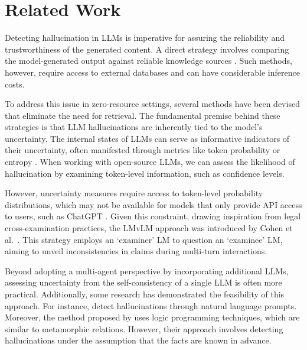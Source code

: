 \section{Related Work}
Detecting hallucination in LLMs is imperative for assuring the reliability and trustworthiness of the generated content. A direct strategy involves comparing the model-generated output against reliable knowledge sources \cite{guo2022survey, augenstein2019multifc, Hanselowski2019ARA, Atanasova2020GeneratingFC, 202307.1723, huo2023retrieving}. Such methods, however, require access to external databases and can have considerable inference costs.

To address this issue in zero-resource settings, several methods have been devised that eliminate the need for retrieval. The fundamental premise behind these strategies is that LLM hallucinations are inherently tied to the model's uncertainty. The internal states of LLMs can serve as informative indicators of their uncertainty, often manifested through metrics like token probability or entropy \cite{varshney2023stitch, yao2023llm}. When working with open-source LLMs, we can assess the likelihood of hallucination by examining token-level information, such as confidence levels.

However, uncertainty measures require access to token-level probability distributions, which may not be available for models that only provide API access to users, such as ChatGPT \cite{chatgptintro}. Given this constraint, drawing inspiration from legal cross-examination practices, the LMvLM approach was introduced by Cohen et al.~\cite{cohen2023lm}. This strategy employs an `examiner' LM to question an `examinee' LM, aiming to unveil inconsistencies in claims during multi-turn interactions.

Beyond adopting a multi-agent perspective by incorporating additional LLMs, assessing uncertainty from the self-consistency of a single LLM is often more practical. Additionally, some research has demonstrated the feasibility of this approach. For instance, \cite{agrawal2023language, xiong2023can, kadavath2022language} detect hallucinations through natural language prompts. Moreover, the method proposed by \cite{li2024halluvault} uses logic programming techniques, which are similar to metamorphic relations. However, their approach involves detecting hallucinations under the assumption that the facts are known in advance.



